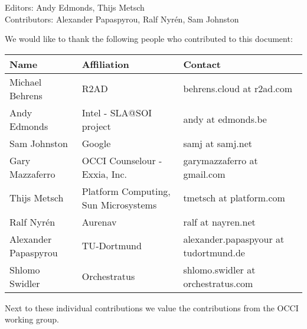 Editors: Andy Edmonds, Thijs Metsch \\
Contributors: Alexander Papaspyrou, Ralf Nyr\'en, Sam Johnston

We would like to thank the following people who contributed to this
document:


\begin{tabular}{l|p{2in}|p{2in}}
Name & Affiliation & Contact \\
\hline
Michael Behrens & R2AD & behrens.cloud at r2ad.com \\
Andy Edmonds & Intel - SLA@SOI project & andy at edmonds.be \\
Sam Johnston & Google & samj at samj.net \\
Gary Mazzaferro & OCCI Counselour - Exxia, Inc. &  garymazzaferro at gmail.com \\ 
Thijs Metsch & Platform Computing, Sun Microsystems & tmetsch at platform.com \\
Ralf Nyrén & Aurenav & ralf at nayren.net \\
Alexander Papaspyrou & TU-Dortmund & alexander.papaspyour at tu\-dortmund.de \\
Shlomo Swidler & Orchestratus & shlomo.swidler at orchestratus.com \\
\end{tabular}

Next to these individual contributions we value the contributions from
the OCCI working group.


